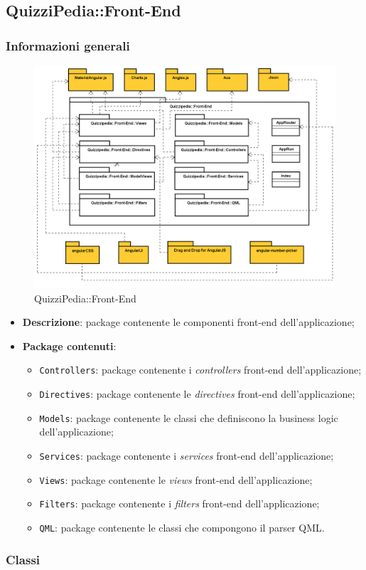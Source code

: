 \subsection{QuizziPedia::Front-End}
\subsubsection{Informazioni generali}
\label{QuizziPedia::Front-End}
\begin{figure}[ht]
	\centering
	\includegraphics[scale=0.35]{UML/Package/QuizziPedia_Front-end.png}
	\caption{QuizziPedia::Front-End}
\end{figure}
\FloatBarrier
	\begin{itemize}
		\item \textbf{Descrizione}: package contenente le componenti front-end dell'applicazione;
		\item \textbf{Package contenuti}:
		\begin{itemize}
			\item \texttt{Controllers}: package contenente i \textit{controllers} front-end dell'applicazione;
			\item \texttt{Directives}: package contenente le \textit{directives} front-end dell'applicazione;
			\item \texttt{Models}: package contenente le classi che definiscono la business logic dell'applicazione;
			\item \texttt{Services}: package contenente i \textit{services} front-end dell'applicazione;
			\item \texttt{Views}: package contenente le \textit{views} front-end dell'applicazione;
			\item \texttt{Filters}: package contenente i \textit{filters} front-end dell'applicazione;
			\item \texttt{QML}: package contenente le classi che compongono il parser QML.
		\end{itemize}
	\end{itemize}

\subsubsection{Classi}
	
	
	